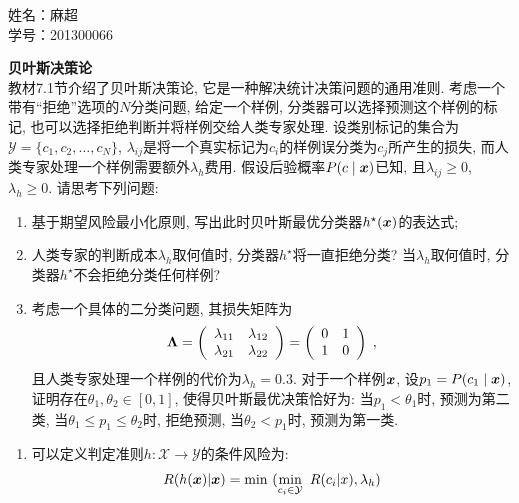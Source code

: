 \documentclass[answers]{exam}  %
\begin{document}
\noindent
姓名：麻超 \\
学号：201300066 \\
\begin{questions}
	\question [20] \textbf{贝叶斯决策论} \\
	教材7.1节介绍了贝叶斯决策论, 它是一种解决统计决策问题的通用准则. 考虑一个带有“拒绝”选项的$N$分类问题, 给定一个样例, 分类器可以选择预测这个样例的标记, 也可以选择拒绝判断并将样例交给人类专家处理. 设类别标记的集合为$\mathcal{Y}=\{c_1,c_2,\ldots,c_N\}$, $\lambda_{ij}$是将一个真实标记为$c_i$的样例误分类为$c_j$所产生的损失, 而人类专家处理一个样例需要额外$\lambda_{h}$费用. 假设后验概率$P(c\mid{\boldsymbol{x}})$已知, 且$\lambda_{ij}\geq 0$, $\lambda_{h}\geq 0$. 请思考下列问题:
	\begin{enumerate}
		\item 基于期望风险最小化原则, 写出此时贝叶斯最优分类器$h^\star({\boldsymbol{x}})$的表达式;
		\item 人类专家的判断成本$\lambda_{h}$取何值时, 分类器$h^\star$将一直拒绝分类? 当$\lambda_{h}$取何值时, 分类器$h^\star$不会拒绝分类任何样例?
		\item 考虑一个具体的二分类问题, 其损失矩阵为
		      \begin{equation}
			      \boldsymbol{\Lambda}=\left(\begin{array}{cc}
					      \lambda_{11} & \lambda_{12} \\
					      \lambda_{21} & \lambda_{22}\end{array}\right)=\left(\begin{array}{cc}
					      0 & 1 \\
					      1 & 0\end{array}\right)\;,
			      \label{ch7_eq:cost_matrix}
		      \end{equation}
		      且人类专家处理一个样例的代价为$\lambda_{h}=0.3$. 对于一个样例${\boldsymbol{x}}$, 设$p_1=P(c_1\mid{\boldsymbol{x}})$, 证明存在$\theta_1,\theta_2\in[0,1]$, 使得贝叶斯最优决策恰好为: 当$p_1<\theta_1$时, 预测为第二类, 当$\theta_1\leq p_1\leq \theta_2$时, 拒绝预测, 当$\theta_2<p_1$时, 预测为第一类.
	\end{enumerate}

	\begin{solution}
		\begin{enumerate}
			\item 可以定义判定准则$h:\mathcal{X}\rightarrow \mathcal{Y}$的条件风险为:
			      \begin{align*}
				      R(h({\boldsymbol{x}})|{\boldsymbol{x}})=\min \ (\min\limits_{c_i\in \mathcal{Y}}\ R(c_i|x),\lambda_h)
			      \end{align*}


\end{enumerate}
\end{solution}
\end{questions}
\end{document}
